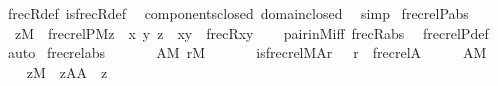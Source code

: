\begin{isabellebody}
%
\isatagproof
{}\isamarkupfalse%
\ frecR{\isacharunderscore}{\kern0pt}def\ is{\isacharunderscore}{\kern0pt}frecR{\isacharunderscore}{\kern0pt}def\ \isamarkupfalse%
\ components{\isacharunderscore}{\kern0pt}closed\ domain{\isacharunderscore}{\kern0pt}closed\ \isamarkupfalse%
\ simp%
\endisatagproof
{\isafoldproof}%
%
\isadelimproof
\isanewline
%
\endisadelimproof
\isanewline
{}\isamarkupfalse%
\ frecrelP{\isacharunderscore}{\kern0pt}abs\ {\isacharcolon}{\kern0pt}\isanewline
\ \ {\isachardoublequoteopen}z{\isasymin}M\ {\isasymLongrightarrow}\ frecrelP{\isacharparenleft}{\kern0pt}{\isacharhash}{\kern0pt}{\isacharhash}{\kern0pt}M{\isacharcomma}{\kern0pt}z{\isacharparenright}{\kern0pt}\ {\isasymlongleftrightarrow}\ {\isacharparenleft}{\kern0pt}{\isasymexists}x\ y{\isachardot}{\kern0pt}\ z\ {\isacharequal}{\kern0pt}\ {\isasymlangle}x{\isacharcomma}{\kern0pt}y{\isasymrangle}\ {\isasymand}\ frecR{\isacharparenleft}{\kern0pt}x{\isacharcomma}{\kern0pt}y{\isacharparenright}{\kern0pt}{\isacharparenright}{\kern0pt}{\isachardoublequoteclose}\isanewline
%
\isadelimproof
\ \ %
\endisadelimproof
%
\isatagproof
{}\isamarkupfalse%
\ pair{\isacharunderscore}{\kern0pt}in{\isacharunderscore}{\kern0pt}M{\isacharunderscore}{\kern0pt}iff\ frecR{\isacharunderscore}{\kern0pt}abs\ \isamarkupfalse%
\ frecrelP{\isacharunderscore}{\kern0pt}def\ \isamarkupfalse%
\ auto%
\endisatagproof
{\isafoldproof}%
%
\isadelimproof
\isanewline
%
\endisadelimproof
\isanewline
{}\isamarkupfalse%
\ frecrel{\isacharunderscore}{\kern0pt}abs{\isacharcolon}{\kern0pt}\isanewline
\ \ \isanewline
\ \ \ \ {\isachardoublequoteopen}A{\isasymin}M{\isachardoublequoteclose}\ {\isachardoublequoteopen}r{\isasymin}M{\isachardoublequoteclose}\isanewline
\ \ \isanewline
\ \ \ \ {\isachardoublequoteopen}is{\isacharunderscore}{\kern0pt}frecrel{\isacharparenleft}{\kern0pt}{\isacharhash}{\kern0pt}{\isacharhash}{\kern0pt}M{\isacharcomma}{\kern0pt}A{\isacharcomma}{\kern0pt}r{\isacharparenright}{\kern0pt}\ {\isasymlongleftrightarrow}\ \ r\ {\isacharequal}{\kern0pt}\ frecrel{\isacharparenleft}{\kern0pt}A{\isacharparenright}{\kern0pt}{\isachardoublequoteclose}\isanewline
%
\isadelimproof
%
\endisadelimproof
%
\isatagproof
{}\isamarkupfalse%
\ {\isacharminus}{\kern0pt}\isanewline
\ \ \isamarkupfalse%
\ {\isacartoucheopen}A{\isasymin}M{\isacartoucheclose}\isanewline
\ \ \isamarkupfalse%
\ {\isachardoublequoteopen}z{\isasymin}M{\isachardoublequoteclose}\ \ {\isachardoublequoteopen}z{\isasymin}A{\isasymtimes}A{\isachardoublequoteclose}\ \ z\isanewline

\end{isabellebody}
